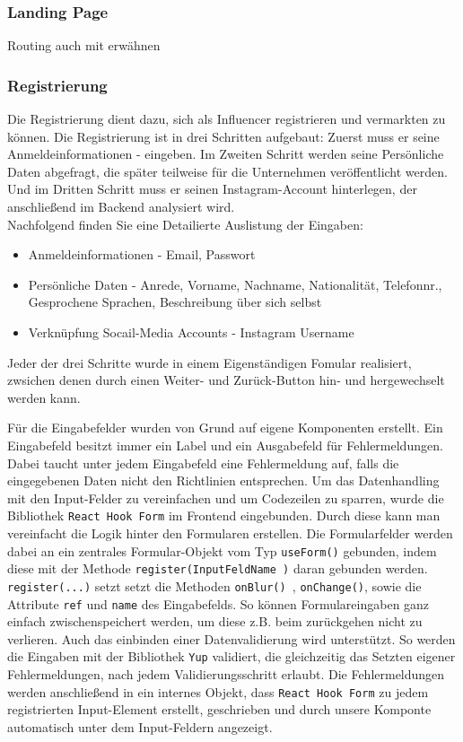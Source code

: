 \documentclass[conference,a4paper,flushend]{cs-techrep}
\begin{document}
\subsubsection{Landing Page\\}
 Routing auch mit erwähnen

\subsubsection{Registrierung\\}
Die Registrierung dient dazu, sich als Influencer registrieren und vermarkten zu können. Die Registrierung ist in drei Schritten aufgebaut:
Zuerst muss er seine Anmeldeinformationen - eingeben. Im Zweiten Schritt werden seine Persönliche Daten abgefragt, die später teilweise für die Unternehmen veröffentlicht werden. Und im Dritten Schritt muss er seinen Instagram-Account hinterlegen, der anschließend im Backend analysiert wird.\\
Nachfolgend finden Sie eine Detailierte Auslistung der Eingaben:
\begin{itemize}
\item{Anmeldeinformationen - Email, Passwort}
\item{Persönliche Daten - Anrede, Vorname, Nachname, Nationalität, Telefonnr., Gesprochene Sprachen, Beschreibung über sich selbst}
\item{Verknüpfung Socail-Media Accounts - Instagram Username}
\end{itemize}
Jeder der drei Schritte wurde in einem Eigenständigen Fomular realisiert, zwsichen denen durch einen Weiter- und Zurück-Button hin- und hergewechselt werden kann.

Für die Eingabefelder wurden von Grund auf eigene Komponenten erstellt. Ein Eingabefeld besitzt immer ein Label und ein Ausgabefeld für Fehlermeldungen. Dabei taucht unter jedem Eingabefeld eine Fehlermeldung auf, falls die eingegebenen Daten nicht den Richtlinien entsprechen. 
Um das Datenhandling mit den Input-Felder zu vereinfachen und um Codezeilen zu sparren, wurde die Bibliothek \texttt{React Hook Form} im Frontend eingebunden. Durch diese kann man vereinfacht die Logik hinter den Formularen erstellen. Die Formularfelder werden dabei an ein zentrales Formular-Objekt vom Typ \texttt{useForm()} gebunden, indem diese mit der Methode \texttt{register(\dq InputFeldName \dq )} daran gebunden werden.  \texttt{register(...)} setzt setzt die Methoden \texttt{onBlur() }, \texttt{onChange()}, sowie die Attribute \texttt{ref} und \texttt{name} des Eingabefelds. 
So können Formulareingaben ganz einfach zwischenspeichert werden, um diese z.B. beim zurückgehen nicht zu verlieren. Auch das einbinden einer Datenvalidierung wird unterstützt. So werden die Eingaben mit der Bibliothek \texttt{Yup} validiert, die gleichzeitig das Setzten eigener Fehlermeldungen, nach jedem Validierungsschritt erlaubt. Die Fehlermeldungen werden anschließend in ein internes Objekt, dass \texttt{React Hook Form} zu jedem registrierten Input-Element erstellt, geschrieben und durch unsere Komponte automatisch unter dem Input-Feldern angezeigt. 
\end{document}
